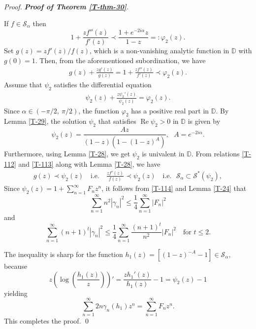 \documentclass[a4paper,12pt]{amsart}
\theoremstyle{definition}
\newenvironment{pf}[1][]{%
 \vskip 3mm
 \noindent
 \ifthenelse{\equal{#1}{}}%
  {{\slshape Proof. }}%
  {{\slshape #1.} }%
 }%
{\qed\bigskip}
\begin{document}
\begin{pf}[\textbf{Proof of Theorem \ref{T-thm-30}}]
If $ f \in \mathcal{S}_\alpha $ then
$$
1 + \frac{zf''(z)}{f'(z)} \prec \frac{1+e^{-2i\alpha }z}{1-z}=:\varphi_2(z) .
$$  
Set $ g(z) = zf'(z)/f(z) $, which is a non-vanishing analytic function in $\mathbb{D}$ with $ g(0) = 1 $. Then, from the aforementioned subordination, we have
\begin{align}\label{T-112}
    g(z) + \frac{zg'(z)}{g(z)}=1 + \frac{zf''(z)}{f'(z)} \prec \varphi_2(z). 
\end{align}
Assume that $\psi_2$ satisfies the differential equation
\begin{align}\label{T-113}
\psi_2(z) + \frac{z\psi_2'(z)}{\psi_2(z)} =\varphi_2(z).
\end{align}
Since $ \alpha \in (-\pi/2,~ \pi/2)  $, the function $ \varphi_2 $ has a positive real part in $ \mathbb{D} $. By Lemma \ref{T-29}, the solution $\psi_2$ that satisfies $\operatorname{Re} \psi_2 >0$ in $\mathbb{D}$ is given by  
\begin{equation*}
\psi_2(z) =  \frac{Az}{(1-z)(1-(1-z)^{A})} , ~~~A=e^{-2i\alpha}.
\end{equation*}
Furthermore, using Lemma \ref{T-28}, we get $\psi_2$ is univalent in $\mathbb{D}$. From relations \eqref{T-112}  and \eqref{T-113} along with Lemma \ref{T-28}, we have
\begin{align}\label{T-114}
g(z) \prec \psi_2(z) \quad \text{i.e.} \quad \frac{zf'(z)}{f(z)} \prec \psi_2(z) \quad \text{i.e.} ~~~\mathcal{S}_\alpha \subset \mathcal{S}^*(\psi_2), 
\end{align}
Since $\psi_2(z) = 1 + \sum_{n=1}^{\infty} F_n z^n$, it follows from \eqref{T-114} and Lemma \ref{T-24} that
$$
\sum_{n=1}^{\infty} n^2 |\gamma_n|^2 \leq \frac{1}{4} \sum_{n=1}^{\infty} |F_n|^2
$$
and
$$
\sum_{n=1}^{\infty} (n+1)^t |\gamma_n|^2 \leq \frac{1}{4} \sum_{n=1}^{\infty} \frac{(n+1)^t}{n^2} |F_n|^2 \quad \text{for } t \leq 2.
$$





The inequality is sharp for the function $h_1(z) = \left[(1-z)^{-A}-1 \right]  \in\mathcal{S}_\alpha$, because
$$
z \left ( \log \left ( \frac{h_1(z)}{z} \right) \right)'=\frac{z h_1'(z)}{h_1(z)} - 1 = \psi_2(z) - 1
$$
yielding
$$
\sum_{n=1}^{\infty} 2n \gamma_n(h_1) z^n = \sum_{n=1}^{\infty} F_n z^n.
$$
This completes the proof.
\end{pf}
\end{document}
